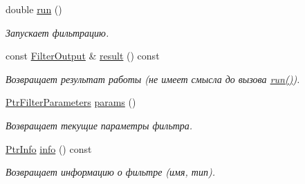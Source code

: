 \begin{DoxyCompactItemize}
\item 
double \hyperlink{class_core_1_1_filter_ad5070e695763edc66d211651b98c09f1}{run} ()
\begin{DoxyCompactList}\small\item\em Запускает фильтрацию. \end{DoxyCompactList}\item 
const \hyperlink{namespace_core_a60877581a235fc9566087b54d463ce9c}{Filter\+Output} \& \hyperlink{class_core_1_1_filter_a3a95474d7ad7933c3cfed7078a9873c3}{result} () const \hypertarget{class_core_1_1_filter_a3a95474d7ad7933c3cfed7078a9873c3}{}\label{class_core_1_1_filter_a3a95474d7ad7933c3cfed7078a9873c3}

\begin{DoxyCompactList}\small\item\em Возвращает результат работы (не имеет смысла до вызова \hyperlink{class_core_1_1_filter_ad5070e695763edc66d211651b98c09f1}{run()}). \end{DoxyCompactList}\item 
\hyperlink{namespace_core_a4811af8148ba137d644b9a61a042cf03}{Ptr\+Filter\+Parameters} \hyperlink{class_core_1_1_filter_a44aa749b49ba46256975ce545531ecf7}{params} ()\hypertarget{class_core_1_1_filter_a44aa749b49ba46256975ce545531ecf7}{}\label{class_core_1_1_filter_a44aa749b49ba46256975ce545531ecf7}

\begin{DoxyCompactList}\small\item\em Возвращает текущие параметры фильтра. \end{DoxyCompactList}\item 
\hyperlink{namespace_core_a647483da8a1266d5bbd3e9bb5cd66d08}{Ptr\+Info} \hyperlink{class_core_1_1_filter_ae84296a5e93ad7319da07dde307d3f5d}{info} () const \hypertarget{class_core_1_1_filter_ae84296a5e93ad7319da07dde307d3f5d}{}\label{class_core_1_1_filter_ae84296a5e93ad7319da07dde307d3f5d}

\begin{DoxyCompactList}\small\item\em Возвращает информацию о фильтре (имя, тип). \end{DoxyCompactList}\end{DoxyCompactItemize}
